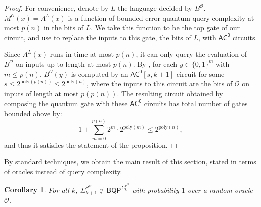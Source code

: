 \documentclass[10pt,a4paper]{article}
\newtheorem{corollary}[theorem]{Corollary}
\newcommand{\poly}{\mathrm{poly}}
\begin{document}
\begin{proof}
For convenience, denote by $L$ the language decided by $B^\mathcal{O}$. $M^\mathcal{O}(x) = A^{L}(x)$ is a function of bounded-error quantum query complexity at most $p(n)$ in the bits of $L$. We take this function to be the top gate of our circuit, and use  to replace the inputs to this gate, the bits of $L$, with $\mathsf{AC^0}$ circuits.

Since $A^{L}(x)$ runs in time at most $p(n)$, it can only query the evaluation of $B^\mathcal{O}$ on inputs up to length at most $p(n)$. By , for each $y \in \{0,1\}^{m}$ with $m \le p(n)$, $B^\mathcal{O}(y)$ is computed by an $\mathsf{AC^0}\left[s, k+1 \right]$ circuit for some $s \le 2^{\poly(p(n))} \le 2^{\poly(n)}$, where the inputs to this circuit are the bits of $\mathcal{O}$ on inputs of length at most $p(p(n))$. The resulting circuit obtained by composing the quantum gate with these $\mathsf{AC^0}$ circuits has total number of gates bounded above by:
\[
1 + \sum_{m=0}^{p(n)} 2^{m} \cdot 2^{\poly(m)} \le 2^{\poly(n)},
\]
and thus it satisfies the statement of the proposition.
\end{proof}

By standard techniques, we obtain the main result of this section, stated in terms of oracles instead of query complexity.


\begin{corollary}
\label{cor:bqp_sigma_k}
For all $k$, $\mathsf{\Sigma}_{k+1}^{\mathsf{P}^\mathcal{O}} \not\subset \mathsf{BQP}^{\mathsf{\Sigma}_k^{\mathsf{P}^\mathcal{O}}}$ with probability $1$ over a random oracle $\mathcal{O}$.
\end{corollary}
\end{document}
